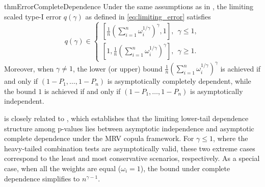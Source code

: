 \documentclass[12pt]{article}
\theoremstyle{plain}
\theoremstyle{plain}
\theoremstyle{definition}
\begin{document}
\begin{restatable}{thm}{ErrorCompleteDependence}
\label{thm:error-complete-dependence}
Under the same assumptions as in , the limiting scaled type-I error $q(\gamma)$ as defined in \eqref{eq:limiting_error} satisfies
\begin{equation*}
q(\gamma)\in%
\begin{cases}
\left[\frac{1}{n}\left(\sum_{i=1}^n\omega_i^{1/\gamma}\right)^{\gamma},1\right],~~\gamma\leq 1,\\[5pt]\left[1,\frac{1}{n}\left(\sum_{i=1}^n\omega_i^{1/\gamma}\right)^{\gamma}\right],~~\gamma \geq 1.
\end{cases} 
\end{equation*}
Moreover, when $\gamma \neq 1$, the lower (or upper) bound $\frac{1}{n}\left(\sum_{i=1}^n \omega_i^{1/\gamma}\right)^{\gamma}$ is achieved if and only if $(1 - P_1, \dots, 1 - P_n)$ is asymptotically completely dependent, while the bound $1$ is achieved if and only if $(1 - P_1, \dots, 1 - P_n)$ is asymptotically independent.
\end{restatable}

 is closely related to , 
 which establishes that the limiting lower-tail dependence structure among p-values lies between asymptotic independence and asymptotic complete dependence under the MRV copula framework. For $\gamma \leq 1$, where the heavy-tailed combination tests are asymptotically valid, these two extreme cases correspond to the least and most conservative scenarios, respectively. 
As a special case, when all the weights are equal ($\omega_i = 1$), the bound under complete dependence simplifies to $n^{\gamma-1}$.
\end{document}
